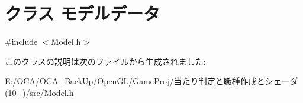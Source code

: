 \hypertarget{class_xE3_x83_xA2_xE3_x83_x87_xE3_x83_xAB_xE3_x83_x87_xE3_x83_xBC_xE3_x82_xBF}{\section{クラス モデルデータ}
\label{class_xE3_x83_xA2_xE3_x83_x87_xE3_x83_xAB_xE3_x83_x87_xE3_x83_xBC_xE3_x82_xBF}
}


{\ttfamily \#include $<$Model.\-h$>$}



このクラスの説明は次のファイルから生成されました\-:\begin{DoxyCompactItemize}
\item 
E\-:/\-O\-C\-A/\-O\-C\-A\-\_\-\-Back\-Up/\-Open\-G\-L/\-Game\-Proj/当たり判定と職種作成とシェーダ(10\-\_)/src/\hyperlink{_model_8h}{Model.\-h}\end{DoxyCompactItemize}
